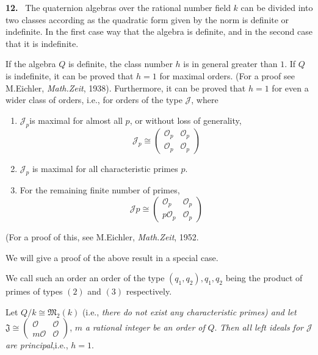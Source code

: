 \textbf{12.}~ The quaternion algebras over the rational number field $k$ can
 be divided  into two classes according as the quadratic form given by
 the norm is definite or indefinite. In the first case way that the
 algebra is definite, and in the second  case that it is indefinite. 
 
 If the algebra $Q$ is definite, the class number $h$ is in general
 greater than $1$. If $Q$ is indefinite, it can be proved that $h=1$
 for maximal orders. (For a proof see M.Eichler, \textit{Math.Zeit},
1938). Furthermore, it can be proved that $h=1$
 for even a wider class of orders, i.e., for orders of the type
 $\mathcal{J}$, where  
 \begin{enumerate}
\item $\mathcal{J}_p$\pageoriginale is maximal for almost all $p$, or without
  loss of generality, 
  $$\mathcal{J}_p \cong
  \begin{pmatrix}
    \mathscr{O}_p & \mathscr{O}_p \\
    \mathscr{O}_p & \mathscr{O}_p 
  \end{pmatrix}
  $$
\item $\mathcal{J}_p$ is maximal for all characteristic primes $p$.
\item For the remaining finite number of primes,
  $$
  \mathcal{J} p  \cong 
  \begin{pmatrix}
    \mathscr{O}_p & \mathscr{O}_p \\
    p\mathscr{O}_p & \mathscr{O}_p
  \end{pmatrix}
  $$
 \end{enumerate} 
 (For a proof of this, see M.Eichler,  \textit{Math.Zeit}, 1952.
 
 We will give a proof of the above result in a special case.
 \begin{note}
   We call such an order an order of the type $(q_1, q_2), q_1, q_2$
   being the product of primes of types $(2)$ and $(3)$ respectively. 
 \end{note} 
 
\begin{theorem}\label{chap1:sec3:thm2} %
  Let $Q/k \cong \mathfrak{M}_2 (k)$ (i.e., {\em there do not exist
    any characteristic primes) and let} $\mathfrak{J}
  \cong \begin{pmatrix} \mathscr{O} & \mathscr{O} \\ m \mathscr{O} &
    \mathscr{O} \end{pmatrix}$, $m$ {\em a rational integer be an
    order of} $Q$. {\em Then all left ideals for $\mathcal{J}$ are
    principal},i.e., $h=1$. 
\end{theorem} 

